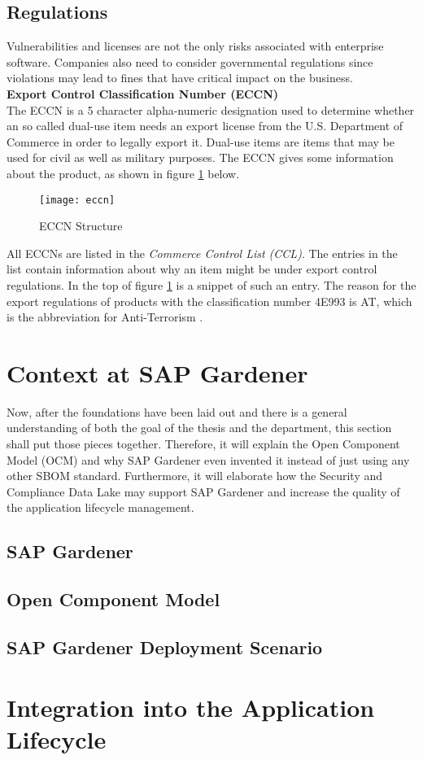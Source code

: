 \subsection{Regulations}
Vulnerabilities and licenses are not the only risks associated with enterprise software. Companies also need to consider governmental regulations since violations may lead to fines that have critical impact on the business.\\

\noindent
\textbf{Export Control Classification Number (ECCN)}\\
\noindent
The ECCN is a 5 character alpha-numeric designation used to determine whether an so called dual-use item needs an export license from the U.S. Department of Commerce in order to legally export it. Dual-use items are items that may be used for civil as well as military purposes. The ECCN gives some information about the product, as shown in figure \ref{fig:ECCN Structure} below.

\begin{figure}[H]
	\centering
	\texttt{[image: eccn]}
	\caption[ECCN Structure]{ECCN Structure }
	\label{fig:ECCN Structure}
\end{figure}

All ECCNs are listed in the \textit{Commerce Control List (CCL)}. The entries in the list contain information about why an item might be under export control regulations. In the top of figure \ref{fig:ECCN Structure} is a snippet of such an entry. The reason for the export regulations of products with the classification number 4E993 is AT, which is the abbreviation for Anti-Terrorism \cite{ECCN}.

\section{Context at SAP Gardener}
Now, after the foundations have been laid out and there is a general understanding of both the goal of the thesis and the department, this section shall put those pieces together. Therefore, it will explain the Open Component Model (OCM) and why SAP Gardener even invented it instead of just using any other SBOM standard. Furthermore, it will elaborate how the Security and Compliance Data Lake may support SAP Gardener and increase the quality of the application lifecycle management.

\subsection{SAP Gardener}


\subsection{Open Component Model}

\subsection{SAP Gardener Deployment Scenario}
\section{Integration into the Application Lifecycle}